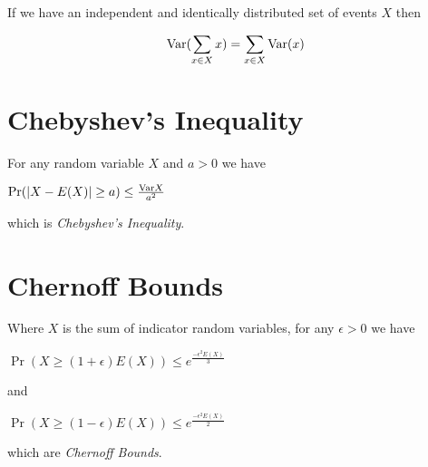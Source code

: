 If we have an independent and identically distributed set of events
$X$ then

\begin{displaymath}
  \text{Var} (\sum_{x \in X} x) = \sum_{x \in X} \text{Var} (x)
\end{displaymath}

\section{Chebyshev's Inequality}

For any random variable $X$ and $a > 0$ we have

\begin{center}
  \begin{math}
    \text{Pr} ( | X - E(X) | \geq a ) \leq \frac{\text{Var}{X}}{a^2}
  \end{math}
\end{center}

which is \emph{Chebyshev's Inequality}.

\section{Chernoff Bounds}

Where $X$ is the sum of indicator random variables, for any $ \epsilon
> 0 $ we have

\begin{center}
  \begin{math}
    \Pr ( X \geq ( 1 + \epsilon ) E(X) ) \leq e^{ \frac{-\epsilon^2 E(X)}{3}}
  \end{math}
\end{center}

and

\begin{center}
  \begin{math}
    \Pr ( X \geq ( 1 - \epsilon ) E(X) ) \leq e^{ \frac{-\epsilon^2 E(X)}{2}}
  \end{math}
\end{center}

which are \emph{Chernoff Bounds}.
